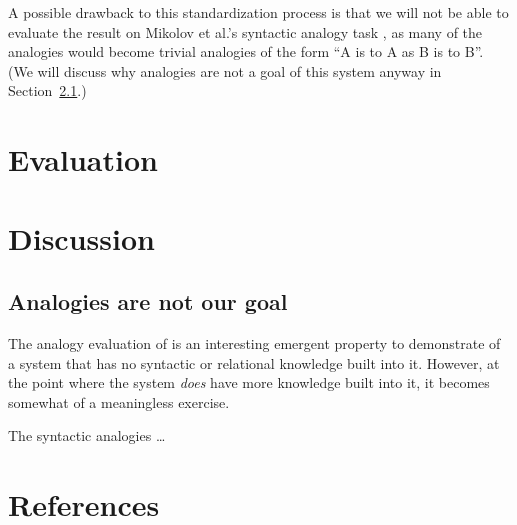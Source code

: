 \documentclass[12pt]{article}
\begin{document}
A possible drawback to this standardization process is that we will not be able
to evaluate the result on Mikolov et al.'s syntactic analogy task
\cite{mikolov2013word2vec}, as many of the analogies would become trivial
analogies of the form ``A is to A as B is to B''. (We will discuss why
analogies are not a goal of this system anyway in Section~\ref{analogies-meh}.)

\section{Evaluation}



\section{Discussion}

\subsection{Analogies are not our goal}
\label{analogies-meh}

The analogy evaluation of \cite{mikolov2013word2vec} is an interesting
emergent property to demonstrate of a system that has no syntactic or
relational knowledge built into it. However, at the point where the system
{\em does} have more knowledge built into it, it becomes somewhat of
a meaningless exercise.

The syntactic analogies \ldots

\section{References}

\end{document}
